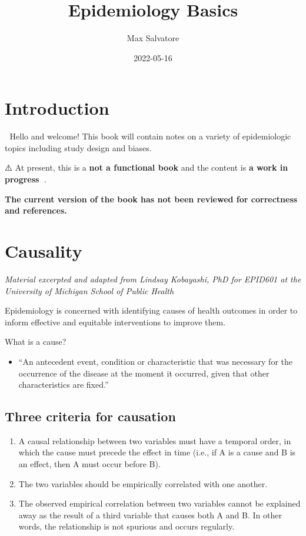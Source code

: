 \documentclass[
]{book}
\title{Epidemiology Basics}
\author{Max Salvatore}
\date{2022-05-16}
\providecommand{\tightlist}{%
  \setlength{\itemsep}{0pt}\setlength{\parskip}{0pt}}
\begin{document}
\maketitle

{
\setcounter{tocdepth}{1}
\tableofcontents
}
\hypertarget{introduction}{%
\chapter{Introduction}\label{introduction}}

👋 Hello and welcome! This book will contain notes on a variety of epidemiologic topics including study design and biases.

⚠️ At present, this is a \textbf{not a functional book} and the content is \textbf{a work in progress} 🔧.

\textbf{The current version of the book has not been reviewed for correctness and references.}

\hypertarget{causality}{%
\chapter{Causality}\label{causality}}

\emph{Material excerpted and adapted from Lindsay Kobayashi, PhD for EPID601 at the University of Michigan School of Public Health}

Epidemiology is concerned with identifying causes of health outcomes in order to inform effective and equitable interventions to improve them.

What is a cause?

\begin{itemize}
\tightlist
\item
  ``An antecedent event, condition or characteristic that was necessary for the occurrence of the disease at the moment it occurred, given that other characteristics are fixed.''
\end{itemize}

\hypertarget{three-criteria-for-causation}{%
\section{Three criteria for causation}\label{three-criteria-for-causation}}

\begin{enumerate}
\def\labelenumi{\arabic{enumi}.}
\tightlist
\item
  A causal relationship between two variables must have a temporal order, in which the cause must precede the effect in time (i.e., if A is a cause and B is an effect, then A must occur before B).
\item
  The two variables should be empirically correlated with one another.
\item
  The observed empirical correlation between two variables cannot be explained away as the result of a third variable that causes both A and B. In other words, the relationship is not spurious and occurs regularly.
\end{enumerate}
\end{document}
